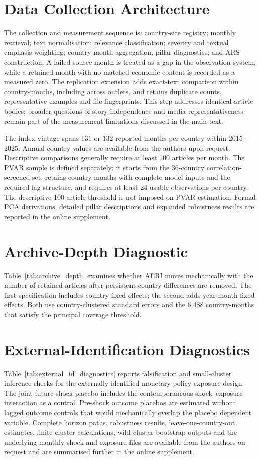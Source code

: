 \documentclass[12pt]{article}
\begin{document}
\section{Data Collection Architecture}\label{app:data_collection}
The collection and measurement sequence is: country-site registry; monthly retrieval; text normalisation; relevance classification; severity and textual emphasis weighting; country-month aggregation; pillar diagnostics; and ARS construction. A failed source month is treated as a gap in the observation system, while a retained month with no matched economic content is recorded as a measured zero. The replication extension adds exact-text comparison within country-months, including across outlets, and retains duplicate counts, representative examples and file fingerprints. This step addresses identical article bodies; broader questions of story independence and media representativeness remain part of the measurement limitations discussed in the main text.

The index vintage spans 131 or 132 reported months per country within 2015--2025. Annual country values are available from the authors upon request. Descriptive comparisons generally require at least 100 articles per month. The PVAR sample is defined separately: it starts from the 36-country correlation-screened set, retains country-months with complete model inputs and the required lag structure, and requires at least 24 usable observations per country. The descriptive 100-article threshold is not imposed on PVAR estimation. Formal PCA derivations, detailed pillar descriptions and expanded robustness results are reported in the online supplement.

\section{Archive-Depth Diagnostic}\label{app:coverage_diag}
Table~\ref{tab:archive_depth} examines whether AERI moves mechanically with the number of retained articles after persistent country differences are removed. The first specification includes country fixed effects; the second adds year-month fixed effects. Both use country-clustered standard errors and the 6,488 country-months that satisfy the principal coverage threshold.


\section{External-Identification Diagnostics}\label{app:external_id}
Table~\ref{tab:external_id_diagnostics} reports falsification and small-cluster inference checks for the externally identified monetary-policy exposure design. The joint future-shock placebo includes the contemporaneous shock--exposure interaction as a control. Pre-shock outcome placebos are estimated without lagged outcome controls that would mechanically overlap the placebo dependent variable. Complete horizon paths, robustness results, leave-one-country-out estimates, finite-cluster calculations, wild-cluster-bootstrap outputs and the underlying monthly shock and exposure files are available from the authors on request and are summarised further in the online supplement.

\end{document}
